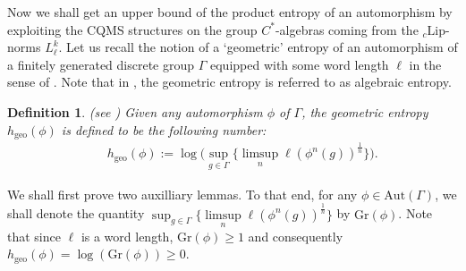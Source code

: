 \documentclass[a4paper,11pt,reqno]{amsart}
\theoremstyle{plain}
\newtheorem{defn}[thm]{Definition}
\theoremstyle{mainthmstyle}
\theoremstyle{named}
\numberwithin{equation}{section}
\newcommand{\Bea}{\begin{eqnarray*}}
\newcommand{\Eea}{\end{eqnarray*}}
\begin{document}
Now we shall get an upper bound of the product entropy of an automorphism by exploiting the CQMS structures on the group $C^{\ast}$-algebras coming from the ${}_c\mathrm{Lip}$-norms $L^{k}_{\ell}$. Let us recall the notion of a `geometric' entropy of an automorphism of a finitely generated discrete group $\Gamma$ equipped with some word length $\ell$ in the sense of \cite{MR4168745}. Note that in \cite{MR4168745}, the geometric entropy is referred to as algebraic entropy. 
\begin{defn}\label{geoment} (see \cite{MR4168745}) Given any automorphism $\phi$ of $\Gamma$, the geometric entropy $h_{\mathrm{geo}}(\phi)$ is defined to be the following number:
\begin{align*}
    && h_{\mathrm{geo}}(\phi):=\log\Big(\sup_{g\in\Gamma}\{\limsup\limits_{n}\ell(\phi^{n}(g))^{\frac{1}{n}}\}\Big).
\end{align*}
\end{defn}
We shall first prove two auxilliary lemmas. To that end, for any $\phi\in\mathrm{Aut}(\Gamma)$, we shall denote the quantity $\sup_{g\in\Gamma}\{\limsup\limits_{n}\ell(\phi^{n}(g))^{\frac{1}{n}}\}$ by $\mathrm{Gr}(\phi)$. Note that since $\ell$ is a word length, $\mathrm{Gr}(\phi)\geq 1$ and consequently $h_{\mathrm{geo}}(\phi)=\log(\mathrm{Gr}(\phi))\geq 0$.
\end{document}
